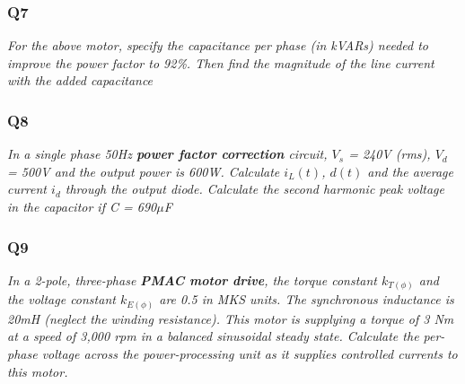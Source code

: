 \documentclass[a4paper,11pt]{article}
\begin{document}
\subsubsection*{Q7}
\textit{For the above motor, specify the capacitance per phase (in kVARs) needed to improve the power factor to 92\%. Then find the magnitude of the line current with the added capacitance}

\subsubsection*{Q8}
\textit{In a single phase 50Hz \textbf{power factor correction} circuit, $V_s$ = 240V (rms), $V_d$ = 500V and the output power is 600W. Calculate $i_L(t)$, $d(t)$ and the average current $i_d$ through the output diode. Calculate the second harmonic peak voltage in the capacitor if C = 690$\mu$F}



\subsubsection*{Q9}
\textit{In a 2-pole, three-phase \textbf{PMAC motor drive}, the torque constant $k_{T(\phi)}$ and the voltage constant $k_{E(\phi)}$ are 0.5 in MKS units. The synchronous inductance is 20mH (neglect the winding resistance). This motor is supplying a torque of 3 Nm at a speed of 3,000 rpm in a balanced sinusoidal steady state. Calculate the per-phase voltage across the power-processing unit as it supplies controlled currents to this motor.}
\end{document}

